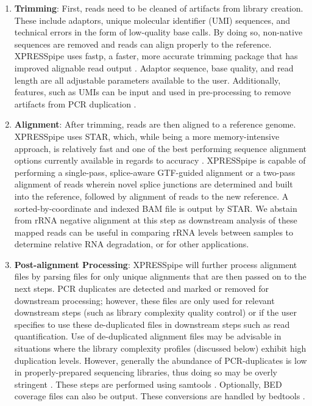 \documentclass[11pt, a4paper, oneside]{article}
\begin{document}
\begin{enumerate}
  \item \textbf{Trimming}: First, reads need to be cleaned of artifacts from library creation. These include adaptors, unique molecular identifier (UMI) sequences, and technical errors in the form of low-quality base calls. By doing so, non-native sequences are removed and reads can align properly to the reference. XPRESSpipe uses fastp, a faster, more accurate trimming package that has improved alignable read output \cite{fastp}. Adaptor sequence, base quality, and read length are all adjustable parameters available to the user. Additionally, features, such as UMIs can be input and used in pre-processing to remove artifacts from PCR duplication \cite{umi}.
  \item \textbf{Alignment}: After trimming, reads are then aligned to a reference genome. XPRESSpipe uses STAR, which, while being a more memory-intensive approach, is relatively fast and one of the best performing sequence alignment options currently available in regards to accuracy \cite{star, baruzzo_natmeth}. XPRESSpipe is capable of performing a single-pass, splice-aware GTF-guided alignment or a two-pass alignment of reads wherein novel splice junctions are determined and built into the reference, followed by alignment of reads to the new reference. A sorted-by-coordinate and indexed BAM file is output by STAR. We abstain from rRNA negative alignment at this step as downstream analysis of these mapped reads can be useful in comparing rRNA levels between samples to determine relative RNA degradation, or for other applications.
  \item \textbf{Post-alignment Processing}: XPRESSpipe will further process alignment files by parsing files for only unique alignments that are then passed on to the next steps. PCR duplicates are detected and marked or removed for downstream processing; however, these files are only used for relevant downstream steps (such as library complexity quality control) or if the user specifies to use these de-duplicated files in downstream steps such as read quantification. Use of de-duplicated alignment files may be advisable in situations where the library complexity profiles (discussed below) exhibit high duplication levels. However, generally the abundance of PCR-duplicates is low in properly-prepared sequencing libraries, thus doing so may be overly stringent \cite{umi}. These steps are performed using samtools \cite{samtools}. Optionally, BED coverage files can also be output. These conversions are handled by bedtools \cite{bedtools}.

\end{enumerate}
\end{document}
